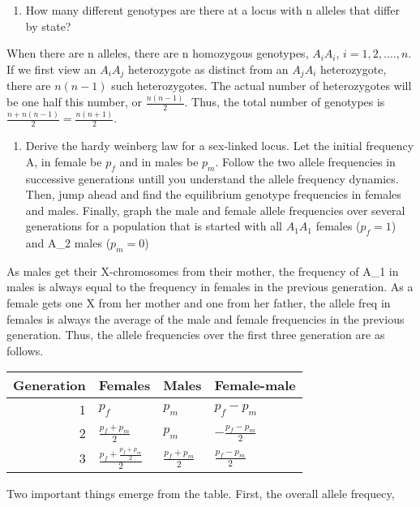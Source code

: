 \documentclass[nofonts,]{tufte-handout}
\providecommand{\tightlist}{%
  \setlength{\itemsep}{0pt}\setlength{\parskip}{0pt}}
\begin{document}
\begin{enumerate}
\def\labelenumi{\arabic{enumi}.}
\tightlist
\item
  How many different genotypes are there at a locus with n alleles that
  differ by state?
\end{enumerate}

When there are n alleles, there are n homozygous genotypes, \(A_iA_i\),
\(i = 1, 2, ...., n\). If we first view an \(A_iA_j\) heterozygote as
distinct from an \(A_jA_i\) heterozygote, there are \(n(n-1)\) such
heterozygotes. The actual number of heterozygotes will be one half this
number, or \(\frac{n(n-1)}{2}\). Thus, the total number of genotypes is
\(\frac{n+n(n-1)}{2}= \frac{n(n+1)}{2}\).

\begin{enumerate}
\def\labelenumi{\arabic{enumi}.}
\setcounter{enumi}{1}
\tightlist
\item
  Derive the hardy weinberg law for a sex-linked locus. Let the initial
  frequency A, in female be \(p_f\) and in males be \(p_m\). Follow the
  two allele frequencies in successive generations untill you understand
  the allele frequency dynamics. Then, jump ahead and find the
  equilibrium genotype frequencies in females and males. Finally, graph
  the male and female allele frequencies over several generations for a
  population that is started with all \(A_1A_1\) females (\(p_f = 1\))
  and A\_2 males (\(p_m = 0\))
\end{enumerate}

As males get their X-chromosomes from their mother, the frequency of
A\_1 in males is always equal to the frequency in females in the
previous generation. As a female gets one X from her mother and one from
her father, the allele freq in females is always the average of the male
and female frequencies in the previous generation. Thus, the allele
frequencies over the first three generation are as follows.

\begin{tabular}{rlll}
\toprule
Generation & Females & Males & Female-male\\
\midrule
1 & $p_f$ & $p_m$ & $p_f - p_m$\\
2 & $\frac{p_f + p_m}{2}$ & $p_m$ & $-\frac{p_f -p_m}{2}$\\
3 & $\frac{p_f + \frac{p_f + p_m}{2}}{2}$ & $\frac{p_f+ p_m}{2}$ & $\frac{p_f -p_m}{2}$\\
\bottomrule
\end{tabular}

Two important things emerge from the table. First, the overall allele
frequecy,
\end{document}
